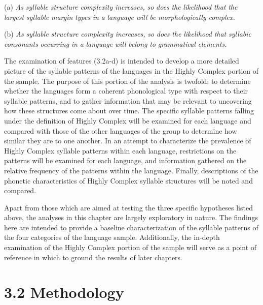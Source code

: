 \ea\label{ex:(3.4)}

(a)  \textit{As} \textit{syllable} \textit{structure} \textit{complexity} \textit{increases,} \textit{so} \textit{does} \textit{the} \textit{likelihood} \textit{that} \textit{the} \textit{largest} \textit{syllable} \textit{margin} \textit{types} \textit{in} \textit{a} \textit{language} \textit{will} \textit{be} \textit{morphologically} \textit{complex.} 

(b)  \textit{As} \textit{syllable} \textit{structure} \textit{complexity} \textit{increases,} \textit{so} \textit{does} \textit{the} \textit{likelihood} \textit{that} \textit{syllabic} \textit{consonants} \textit{occurring} \textit{in} \textit{a} \textit{language} \textit{will} \textit{belong} \textit{to} \textit{grammatical} \textit{elements.}

\z

  The examination of features (3.2a-d) is intended to develop a more detailed picture of the syllable patterns of the languages in the Highly Complex portion of the sample. The purpose of this portion of the analysis is twofold: to determine whether the languages form a coherent phonological type with respect to their syllable patterns, and to gather information that may be relevant to uncovering how these structures come about over time. The specific syllable patterns falling under the definition of Highly Complex will be examined for each language and compared with those of the other languages of the group to determine how similar they are to one another. In an attempt to characterize the prevalence of Highly Complex syllable patterns within each language, restrictions on the patterns will be examined for each language, and information gathered on the relative frequency of the patterns within the language. Finally, descriptions of the phonetic characteristics of Highly Complex syllable structures will be noted and compared.

  Apart from those which are aimed at testing the three specific hypotheses listed above, the analyses in this chapter are largely exploratory in nature. The findings here are intended to provide a baseline characterization of the syllable patterns of the four categories of the language sample. Additionally, the in-depth examination of the Highly Complex portion of the sample will serve as a point of reference in which to ground the results of later chapters.

\section{3.2 Methodology} 
